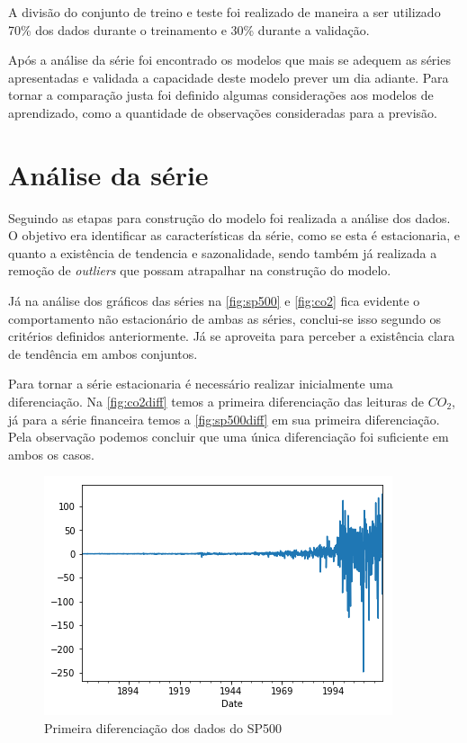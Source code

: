 \documentclass[
    12pt,
    oneside,
    a4paper,
    english,
    brazil
]{abntex2}
\begin{document}
A  divisão do  conjunto  de treino  e  teste  foi realizado  de  maneira a  ser
utilizado 70\% dos dados durante o treinamento e 30\% durante a validação.

Após a análise da série foi encontrado os modelos que mais se adequem as séries
apresentadas e validada  a capacidade deste modelo prever um  dia adiante. Para
tornar a  comparação justa  foi definido algumas  considerações aos  modelos de
aprendizado, como a quantidade de observações consideradas para a previsão.

\section{Análise da série}

Seguindo as etapas para construção do modelo foi realizada a análise dos dados.
O  objetivo  era identificar  as  características  da  série,  como se  esta  é
estacionaria, e quanto  a existência de tendencia e  sazonalidade, sendo também
já realizada a remoção de \textit{outliers} que possam atrapalhar na construção
do modelo.

Já   na   análise   dos   gráficos  das   séries   na   \autoref{fig:sp500}   e
\autoref{fig:co2} fica  evidente o comportamento  não estacionário de  ambas as
séries, conclui-se  isso segundo  os critérios  definidos anteriormente.  Já se
aproveita para perceber a existência clara de tendência em ambos conjuntos.

Para  tornar  a  série  estacionaria é  necessário  realizar  inicialmente  uma
diferenciação.  Na \autoref{fig:co2diff}  temos  a  primeira diferenciação  das
leituras de $CO_2$, já para  a série financeira temos a \autoref{fig:sp500diff}
em sua primeira  diferenciação. Pela observação podemos concluir  que uma única
diferenciação foi suficiente em ambos os casos.

\begin{figure}[ht]
    \centering
    \caption{Primeira diferenciação dos dados do SP500}\label{fig:sp500diff}
    \includegraphics[width=.5\linewidth]{images/sp500diff.png}
\end{figure}
\end{document}

